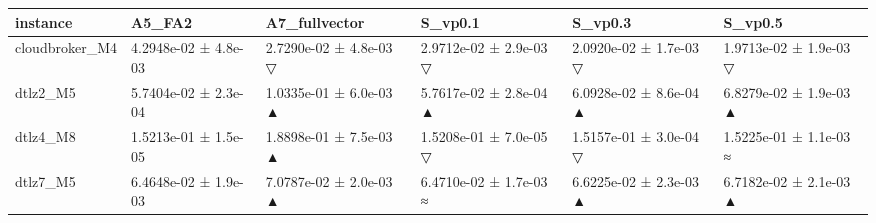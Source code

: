 \begin{tabular}{llllll}
\toprule
instance & A5\_FA2 & A7\_fullvector & S\_vp0.1 & S\_vp0.3 & S\_vp0.5 \\
\midrule
cloudbroker\_M4 & 4.2948e-02 ± 4.8e-03 & 2.7290e-02 ± 4.8e-03 ▽ & 2.9712e-02 ± 2.9e-03 ▽ & 2.0920e-02 ± 1.7e-03 ▽ & 1.9713e-02 ± 1.9e-03 ▽ \\
dtlz2\_M5 & 5.7404e-02 ± 2.3e-04 & 1.0335e-01 ± 6.0e-03 ▲ & 5.7617e-02 ± 2.8e-04 ▲ & 6.0928e-02 ± 8.6e-04 ▲ & 6.8279e-02 ± 1.9e-03 ▲ \\
dtlz4\_M8 & 1.5213e-01 ± 1.5e-05 & 1.8898e-01 ± 7.5e-03 ▲ & 1.5208e-01 ± 7.0e-05 ▽ & 1.5157e-01 ± 3.0e-04 ▽ & 1.5225e-01 ± 1.1e-03 ≈ \\
dtlz7\_M5 & 6.4648e-02 ± 1.9e-03 & 7.0787e-02 ± 2.0e-03 ▲ & 6.4710e-02 ± 1.7e-03 ≈ & 6.6225e-02 ± 2.3e-03 ▲ & 6.7182e-02 ± 2.1e-03 ▲ \\
\bottomrule
\end{tabular}
